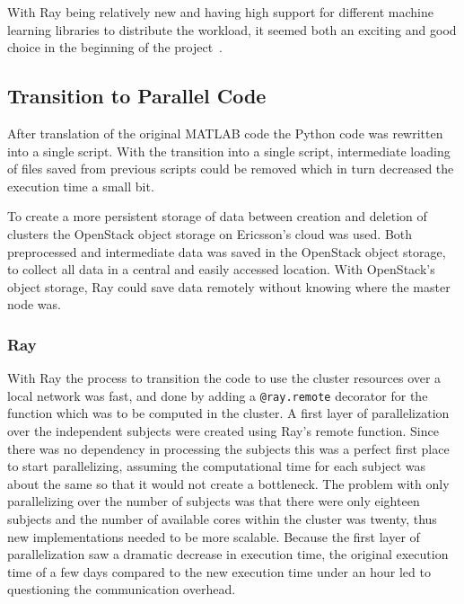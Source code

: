 \documentclass[12pt, a4paper]{article}
\begin{document}
With Ray being relatively new and having high support for different machine learning libraries to distribute the workload, it seemed both an exciting and good choice in the beginning of the project~\cite{ray:RaySGD, ray:Rayrllib, ray:RayTune, ray:RaySklearn}. 

\subsection{Transition to Parallel Code}
After translation of the original MATLAB code the Python code was rewritten into a single script.
With the transition into a single script, intermediate loading of files saved from previous scripts could be removed which in turn decreased the execution time a small bit.

To create a more persistent storage of data between creation and deletion of clusters the OpenStack object storage on Ericsson's cloud was used.
Both preprocessed and intermediate data was saved in the OpenStack object storage, to collect all data in a central and easily accessed location.
With OpenStack's object storage, Ray could save data remotely without knowing where the master node was.

\subsubsection{Ray}

With Ray the process to transition the code to use the cluster resources over a local network was fast, and done by adding a \texttt{@ray.remote} decorator for the function which was to be computed in the cluster.
A first layer of parallelization over the independent subjects were created using Ray's remote function.
Since there was no dependency in processing the subjects this was a perfect first place to start parallelizing, assuming the computational time for each subject was about the same so that it would not create a bottleneck.
The problem with only parallelizing over the number of subjects was that there were only eighteen subjects and the number of available cores within the cluster was twenty, thus new implementations needed to be more scalable.
Because the first layer of parallelization saw a dramatic decrease in execution time, the original execution time of a few days compared to the new execution time under an hour led to questioning the communication overhead.
\end{document}
